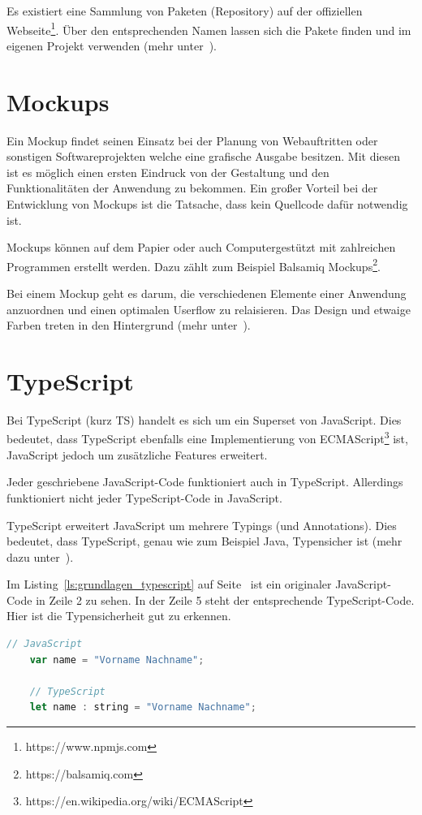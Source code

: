 Es existiert eine Sammlung von Paketen (Repository) auf der offiziellen Webseite\footnote{https://www.npmjs.com}. Über
den entsprechenden Namen lassen sich die Pakete finden und im eigenen Projekt verwenden
(mehr unter~\cite{book_grundlagen_npm}).

\section{Mockups}
Ein Mockup findet seinen Einsatz bei der Planung von Webauftritten oder sonstigen Softwareprojekten welche eine grafische
Ausgabe besitzen. Mit diesen ist es möglich einen ersten Eindruck von der Gestaltung und den Funktionalitäten der
Anwendung zu bekommen. Ein großer Vorteil bei der Entwicklung von Mockups ist die Tatsache, dass kein Quellcode dafür
notwendig ist.

Mockups können auf dem Papier oder auch Computergestützt mit zahlreichen Programmen erstellt werden. Dazu zählt zum
Beispiel Balsamiq Mockups\footnote{https://balsamiq.com}.

Bei einem Mockup geht es darum, die verschiedenen Elemente einer Anwendung anzuordnen und einen optimalen Userflow
zu relaisieren. Das Design und etwaige Farben treten in den Hintergrund (mehr unter~\cite{book_grundlagen_mockups}).

\section{TypeScript}
Bei TypeScript (kurz TS) handelt es sich um ein Superset von JavaScript. Dies bedeutet, dass TypeScript ebenfalls eine
Implementierung von ECMAScript\footnote{https://en.wikipedia.org/wiki/ECMAScript} ist, JavaScript jedoch um zusätzliche
Features erweitert.

Jeder geschriebene JavaScript-Code funktioniert auch in TypeScript. Allerdings funktioniert nicht jeder TypeScript-Code
in JavaScript.

TypeScript erweitert JavaScript um mehrere Typings (und Annotations). Dies bedeutet, dass TypeScript, genau wie zum
Beispiel Java, Typensicher ist (mehr dazu unter~\cite{book_grundlagen_typescript}).

Im Listing~\ref{ls:grundlagen_typescript} auf Seite~\pageref{ls:grundlagen_typescript} ist ein originaler
JavaScript-Code in Zeile 2 zu sehen. In der Zeile 5 steht der entsprechende TypeScript-Code. Hier ist die
Typensicherheit gut zu erkennen.

\begin{lstlisting}[language=JavaScript, caption=Unterschied zwischen JavaScript und TypeScript, label=ls:grundlagen_typescript]
    // JavaScript
    var name = "Vorname Nachname";

    // TypeScript
    let name : string = "Vorname Nachname";
\end{lstlisting}

